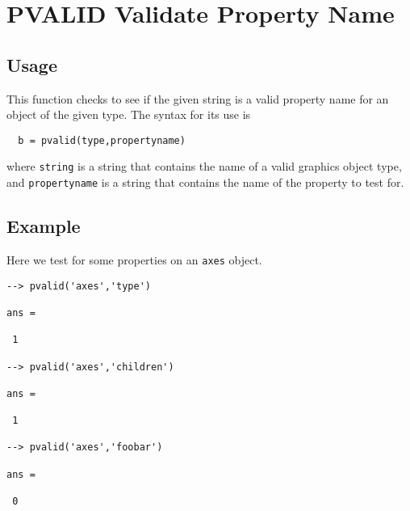 \section{PVALID Validate Property Name}

\subsection{Usage}

This function checks to see if the given string is a valid
property name for an object of the given type.  The syntax
for its use is
\begin{verbatim}
  b = pvalid(type,propertyname)
\end{verbatim}
where \verb|string| is a string that contains the name of a 
 valid graphics object type, and
\verb|propertyname| is a string that contains the name of the
property to test for.
\subsection{Example}

Here we test for some properties on an \verb|axes| object.
\begin{verbatim}
--> pvalid('axes','type')

ans = 

 1 

--> pvalid('axes','children')

ans = 

 1 

--> pvalid('axes','foobar')

ans = 

 0 
\end{verbatim}
